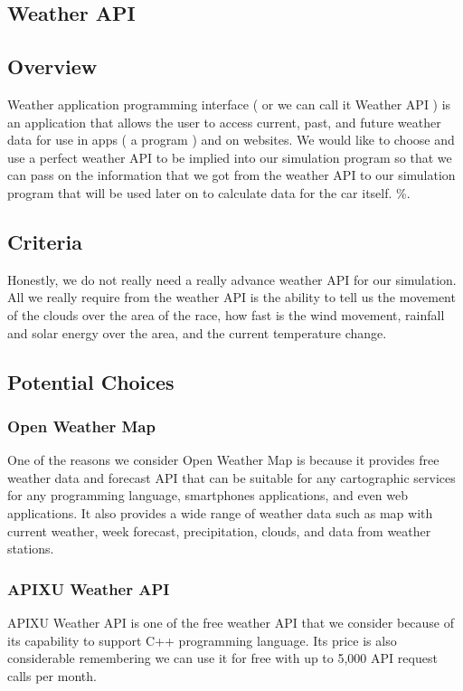 \documentclass[onecolumn, draftclsnofoot,10pt, compsoc]{IEEEtran}
\begin{document}
\begin{singlespace}
\renewcommand{\familydefault}{\sfdefault}

\section{Weather API}

\subsection{Overview}
Weather application programming interface ( or we can call it Weather API ) is an application that allows the user to access current, past, and future weather data for use in apps ( a program ) and on websites. We would like to choose and use a perfect weather API to be implied into our simulation program so that we can pass on the information that we got from the weather API to our simulation program that will be used later on to calculate data for the car itself. \%.

\subsection{Criteria}
Honestly, we do not really need a really advance weather API for our simulation. All we really require from the weather API is the ability to tell us the movement of the clouds over the area of the race, how fast is the wind movement, rainfall and solar energy over the area, and the current temperature change. 

\subsection{Potential Choices}

\subsubsection{Open Weather Map}
One of the reasons we consider Open Weather Map is because it provides free weather data and forecast API that can be suitable for any cartographic services for any programming language, smartphones applications, and even web applications. It also provides a wide range of weather data such as map with current weather, week forecast, precipitation, clouds, and data from weather stations.  

\subsubsection{APIXU Weather API }
APIXU Weather API is one of the free weather API that we consider because of its capability to support C++ programming language. Its price is also considerable remembering we can use it for free with up to 5,000 API request calls per month. 


\end{singlespace}
\end{document}
